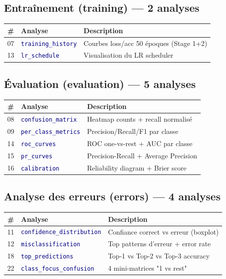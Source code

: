 \documentclass[11pt,a4paper,oneside]{report}
\newcommand{\code}[1]{\texttt{\textcolor{navy}{#1}}}
\begin{document}
\subsection{Entraînement (training) — 2 analyses}

\begin{table}[!htbp]
\centering
\begin{tabularx}{\textwidth}{|c|l|X|}
\hline
\textbf{\#} & \textbf{Analyse} & \textbf{Description} \\
\hline
07 & \code{training\_history} & Courbes loss/acc 50 époques (Stage 1+2) \\
13 & \code{lr\_schedule} & Visualisation du LR scheduler \\
\hline
\end{tabularx}
\end{table}

\subsection{Évaluation (evaluation) — 5 analyses}

\begin{table}[!htbp]
\centering
\begin{tabularx}{\textwidth}{|c|l|X|}
\hline
\textbf{\#} & \textbf{Analyse} & \textbf{Description} \\
\hline
08 & \code{confusion\_matrix} & Heatmap counts + recall normalisé \\
09 & \code{per\_class\_metrics} & Precision/Recall/F1 par classe \\
14 & \code{roc\_curves} & ROC one-vs-rest + AUC par classe \\
15 & \code{pr\_curves} & Precision-Recall + Average Precision \\
16 & \code{calibration} & Reliability diagram + Brier score \\
\hline
\end{tabularx}
\end{table}

\subsection{Analyse des erreurs (errors) — 4 analyses}

\begin{table}[!htbp]
\centering
\begin{tabularx}{\textwidth}{|c|l|X|}
\hline
\textbf{\#} & \textbf{Analyse} & \textbf{Description} \\
\hline
11 & \code{confidence\_distribution} & Confiance correct vs erreur (boxplot) \\
12 & \code{misclassification} & Top patterns d'erreur + error rate \\
18 & \code{top\_predictions} & Top-1 vs Top-2 vs Top-3 accuracy \\
22 & \code{class\_focus\_confusion} & 4 mini-matrices "1 vs rest" \\
\hline
\end{tabularx}
\end{table}
\end{document}
